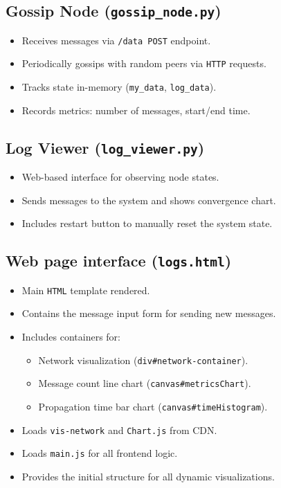 \documentclass[a4paper,12pt]{article}
\begin{document}
\subsection*{Gossip Node (\texttt{gossip\_node.py})}
\begin{itemize}
    \item Receives messages via \verb|/data POST| endpoint.
    \item Periodically gossips with random peers via \verb|HTTP| requests.
    \item Tracks state in-memory (\verb|my_data|, \verb|log_data|).
    \item Records metrics: number of messages, start/end time.
\end{itemize}

\subsection*{Log Viewer (\texttt{log\_viewer.py})}
\begin{itemize}
    \item Web-based interface for observing node states.
    \item Sends messages to the system and shows convergence chart.
    \item Includes restart button to manually reset the system state.
\end{itemize}

\subsection*{Web page interface (\texttt{logs.html})}
\begin{itemize}
    \item Main \verb|HTML| template rendered.
    \item Contains the message input form for sending new messages.
    \item Includes containers for:
    \begin{itemize}
        \item Network visualization (\verb|div#network-container|).
        \item Message count line chart (\verb|canvas#metricsChart|).
        \item Propagation time bar chart (\verb|canvas#timeHistogram|).
    \end{itemize}
    \item Loads \verb|vis-network| and \verb|Chart.js| from CDN.
    \item Loads \verb|main.js| for all frontend logic.
    \item Provides the initial structure for all dynamic visualizations.
\end{itemize}
\end{document}
